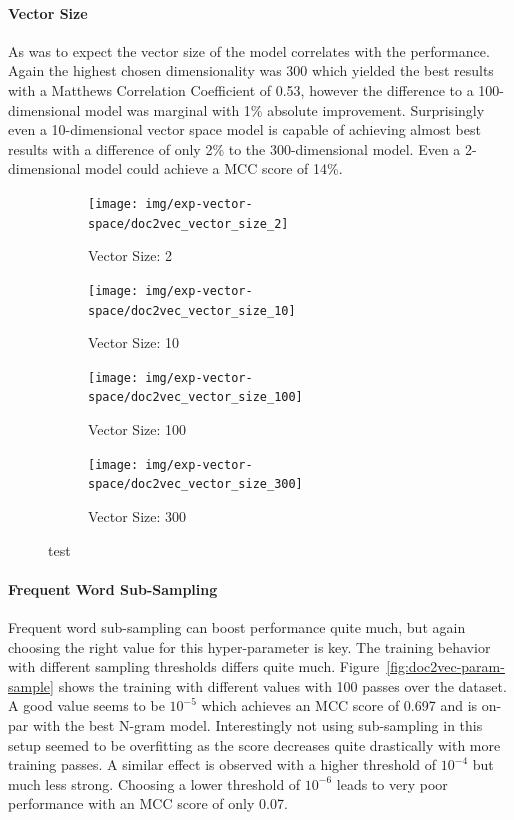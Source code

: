 \paragraph{Vector Size}
As was to expect the vector size of the model correlates with the performance. Again the highest chosen dimensionality was 300 which yielded the best results with a Matthews Correlation Coefficient of 0.53, however the difference to a 100-dimensional model was marginal with 1\% absolute improvement. Surprisingly even a 10-dimensional vector space model is capable of achieving almost best results with a difference of only 2\% to the 300-dimensional model. Even a 2-dimensional model could achieve a MCC score of 14\%.

\begin{figure}[h!]
    \centering
    \begin{subfigure}[b]{0.49\textwidth}
      \texttt{[image: img/exp-vector-space/doc2vec\_vector\_size\_2]}
      \caption{Vector Size: 2}
\label{fig:doc2vec_vector_size_2}
    \end{subfigure}
    \begin{subfigure}[b]{0.49\textwidth}
      \texttt{[image: img/exp-vector-space/doc2vec\_vector\_size\_10]}
      \caption{Vector Size: 10}
\label{fig:doc2vec_vector_size_10}
    \end{subfigure}
    \begin{subfigure}[b]{0.49\textwidth}
      \texttt{[image: img/exp-vector-space/doc2vec\_vector\_size\_100]}
      \caption{Vector Size: 100}
\label{fig:doc2vec_vector_size_100}
  \end{subfigure}
  \begin{subfigure}[b]{0.49\textwidth}
    \texttt{[image: img/exp-vector-space/doc2vec\_vector\_size\_300]}
    \caption{Vector Size: 300}
\label{fig:doc2vec_vector_size_300}
  \end{subfigure}
\caption{test}
\label{fig:doc2vec_vector_size}
\end{figure}

\paragraph{Frequent Word Sub-Sampling}
Frequent word sub-sampling can boost performance quite much, but again choosing the right value for this hyper-parameter is key. The training behavior with different sampling thresholds differs quite much. Figure~\ref{fig:doc2vec-param-sample} shows the training with different values with 100 passes over the dataset. A good value seems to be $10^{-5}$ which achieves an MCC score of 0.697 and is on-par with the best N-gram model. Interestingly not using sub-sampling in this setup seemed to be overfitting as the score decreases quite drastically with more training passes. A similar effect is observed with a higher threshold of $10^{-4}$ but much less strong. Choosing a lower threshold of $10^{-6}$ leads to very poor performance with an MCC score of only 0.07.

